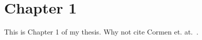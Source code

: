 \chapter{Chapter 1}
\label{chap:ch1}

This is Chapter 1 of my thesis. Why not cite Cormen et. at.~\cite{cormen2009algo}.
